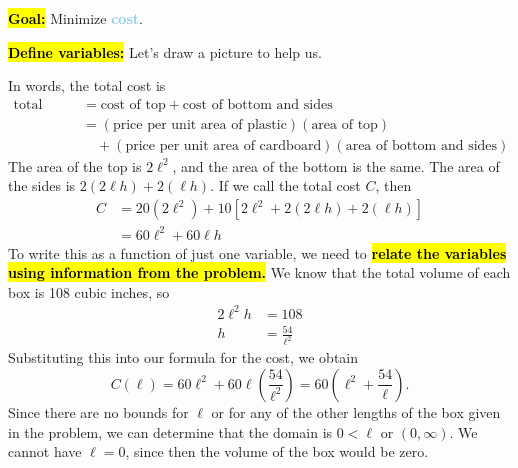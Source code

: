 \documentclass{article}
\newcommand{\highlight}[1]{\boldmath\hl{\textbf{#1}}\unboldmath}
\newcommand{\goal}[1]{\textbf{\textcolor{skyblue}{#1}}}
\begin{document}
\begin{enumerate}
  \begin{solution}
    \highlight{Goal:} Minimize \goal{cost}.

    \highlight{Define variables:}
    Let's draw a picture to help us.
    
    \begin{center}
    \end{center}
    In words, the total cost is
      \begin{align*}
        \text{total cost} &= \text{cost of top} + \text{cost of bottom and sides} \\
        &= (\text{price per unit area of plastic})(\text{area of top}) \\
        &\hspace{1em} + 
        (\text{price per unit area of cardboard})(\text{area of bottom and sides})
      \end{align*}
    The area of the top is $2\ell^2$, and the area of the bottom is the same.
    The area of the sides is $2(2\ell h) + 2(\ell h)$.
    If we call the total cost $C$, then
    \begin{align*}
      C &= 20(2\ell^2) + 10[2\ell^2 + 2(2\ell h) + 2(\ell h)] \\
      &= 60 \ell^2 + 60 \ell h
    \end{align*}      
      To write this as a function of just one variable, we
      need to \highlight{relate the variables using information from
      the problem.} We know that the total volume of each box is 108 cubic
      inches, so
    \begin{align*}
      2\ell^2h &= 108 \\
      h &= \frac{54}{\ell^2}
    \end{align*}
    Substituting this into our formula for the cost, we obtain
    \[C(\ell) = 60 \ell^2 + 60 \ell\left(\frac{54}{\ell^2}\right)
    = 60\left(\ell^2 + \frac{54}{\ell}\right).\]
    Since there are no bounds for $\ell$ or for any of the other lengths
    of the box given in the problem, we can determine that the domain is
    $0 < \ell$ or $(0, \infty)$. We cannot have $\ell=0$, since then
    the volume of the box would be zero.


\end{solution}
\end{enumerate}
\end{document}
